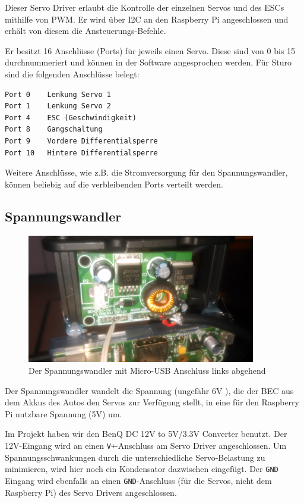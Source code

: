 \documentclass[a4paper,10pt]{scrartcl}
\begin{document}
    Dieser Servo Driver \cite{adafruitmod} erlaubt die Kontrolle der einzelnen
    Servos und des ESCs mithilfe von PWM.
    Er wird über I2C an den Raspberry Pi angeschlossen und erhält von diesem die
    Ansteuerungs-Befehle.

    Er besitzt 16 Anschlüsse (Ports) für jeweils einen Servo.
    Diese sind von 0 bis 15 durchnummeriert und können in der Software
    angesprochen werden.
    Für Sturo sind die folgenden Anschlüsse belegt:

    \begin{lstlisting}
Port 0    Lenkung Servo 1
Port 1    Lenkung Servo 2
Port 4    ESC (Geschwindigkeit)
Port 8    Gangschaltung
Port 9    Vordere Differentialsperre
Port 10   Hintere Differentialsperre
    \end{lstlisting}

    Weitere Anschlüsse, wie z.B. die Stromversorgung für den Spannungswandler,
    können beliebig auf die verbleibenden Ports verteilt werden.

  \subsection{Spannungswandler}

    \begin{figure}[ht!]
      \centering
      \includegraphics[width=100mm]{pics/spannungswandler.jpg}
      \caption{Der Spannungswandler mit Micro-USB Anschluss links abgehend}
    \end{figure}

    Der Spannungswandler wandelt die Spannung (ungefähr 6V \cite{traxxasspecs}),
    die der BEC aus dem Akkus des Autos den Servos zur Verfügung stellt, in eine
    für den Raspberry Pi nutzbare Spannung (5V) um.

    Im Projekt haben wir den BenQ DC 12V to 5V/3.3V Converter benutzt.
    Der 12V-Eingang wird an einen \lstinline{V+}-Anschluss am Servo Driver
    angeschlossen.
    Um Spannungsschwankungen durch die unterschiedliche Servo-Belastung zu
    minimieren, wird hier noch ein Kondensator dazwischen eingefügt.
    Der \lstinline{GND} Eingang wird ebenfalls an einen
    \lstinline{GND}-Anschluss (für die Servos, nicht dem Raspberry Pi) des Servo
    Drivers angeschlossen.
\end{document}
